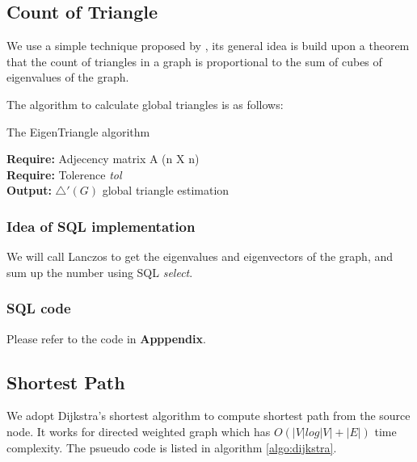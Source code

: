 \subsection{Count of Triangle}
We use a simple technique proposed by \cite{tsourakakis2008fast}, its general idea is build upon a theorem that the count of triangles in a graph is proportional to the sum of cubes of eigenvalues of the graph. 

The algorithm to calculate global triangles is as follows:

\begin{algorithm}
\caption{The EigenTriangle algorithm}
{\bf Require: } Adjecency matrix A (n X n)\\
{\bf Require: } Tolerence \emph{tol}\\
{\bf Output: } $\bigtriangleup'(G)$ global triangle estimation
\begin{algorithmic}
\STATE{$\overrightarrow{\Lambda} \gets [\lambda_{1}]$}
\REPEAT 
\end{algorithmic}
\end{algorithm}

\subsubsection{Idea of SQL implementation}
We will call Lanczos to get the eigenvalues and eigenvectors of the graph, and sum up the number using SQL \emph{select}.

\subsubsection{SQL code}
Please refer to the code in {\bf Apppendix}.

\subsection{Shortest Path}
We adopt Dijkstra's shortest algorithm to compute shortest path from the source node. It works for directed weighted
graph which has $O(|V| log |V| + |E|)$ time complexity. The psueudo code is listed in algorithm \ref{algo:dijkstra}.

